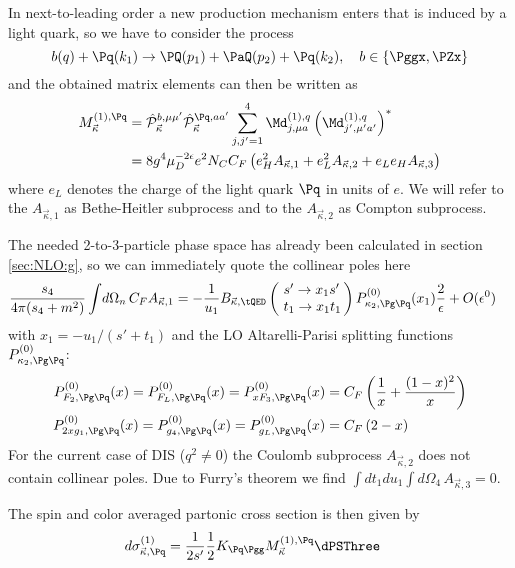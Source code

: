 In next-to-leading order a new production mechanism enters that is induced by a light quark, so we have to consider the process
\begin{equation}
b(q) + \Pq(k_1) \rightarrow \PQ(p_1)+\PaQ(p_2) + \Pq(k_2),\quad b\in\{\Pggx,\PZx\}
\end{equation}
and the obtained matrix elements can then be written as
\begin{align}
M_{\vec \kappa}^{(1),\Pq} &= \hat {\mathcal P}_{\vec \kappa}^{b,\mu\mu'}\hat {\mathcal P}_{\vec \kappa}^{\Pq,aa'}\sum_{j,j'=1}^4\Md^{(1),q}_{j,\mu a}\left(\Md^{(1),q}_{j',\mu' a'}\right)^*\\
 &= 8g^4\mu_D^{-2\epsilon}e^2 N_C C_F\left( e_H^2 A_{\vec \kappa,1} +  e_L^2 A_{\vec \kappa,2} +  e_L e_H A_{\vec \kappa,3} \right)
\end{align}
where $e_L$ denotes the charge of the light quark $\Pq$ in units of $e$. We will refer to the $A_{\vec\kappa,1}$ as Bethe-Heitler subprocess and to the $A_{\vec\kappa,2}$ as Compton subprocess.

The needed 2-to-3-particle phase space has already been calculated in section \ref{sec:NLO:g}, so we can immediately quote the collinear poles here
\begin{align}
\frac{s_4}{4\pi(s_4+m^2)}\int\!d\Omega_n \,C_F A_{\vec \kappa,1} &=-\frac 1 {u_1}B_{\vec \kappa,\tQED}\left(\!\begin{array}{l}s'\rightarrow x_1s'\\t_1\rightarrow x_1 t_1\end{array}\!\!\right) P^{(0)}_{\kappa_2,\Pg\Pq}(x_1)\frac 2 \epsilon + O(\epsilon^0)
\end{align}
with $x_1 = -u_1/(s'+t_1)$ and the LO Altarelli-Parisi splitting functions $P^{(0)}_{\kappa_2,\Pg\Pq}$\cite{Altarelli:1977zs}:
\begin{align}
P^{(0)}_{F_2,\Pg\Pq}(x) = P^{(0)}_{F_L,\Pg\Pq}(x) = P^{(0)}_{xF_3,\Pg\Pq}(x) &= C_F\left(\frac 1 x + \frac {(1-x)^2} x\right) \label{eq:PGLgq} \\
P^{(0)}_{2xg_1,\Pg\Pq}(x) = P^{(0)}_{g_4,\Pg\Pq}(x) = P^{(0)}_{g_L,\Pg\Pq}(x) &= C_F\left(2-x\right) \label{eq:PPgq}
\end{align}
For the current case of DIS ($q^2\neq 0$) the Coulomb subprocess $A_{\vec \kappa,2}$ does not contain collinear poles. Due to Furry's theorem we find $\int\!dt_1du_1\int\!d\Omega_4 \,A_{\vec \kappa,3}=0$.

The spin and color averaged partonic cross section is then given by
\begin{align}
d\sigma_{\vec \kappa,\Pq}^{(1)} &= \frac 1 {2s'}\frac 1 2 K_{\Pq\Pgg} M_{\vec \kappa}^{(1),\Pq} \dPSThree
\end{align}
